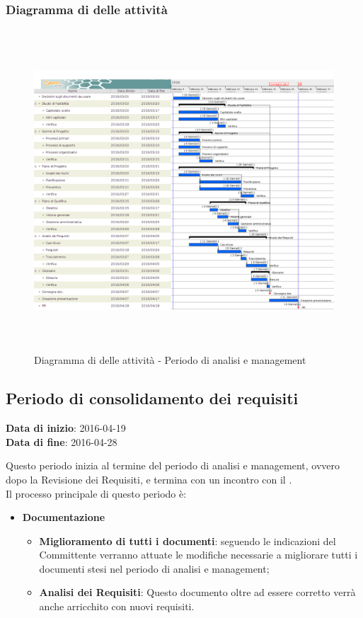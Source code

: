 		
		\subsubsection{Diagramma di  delle attività}
		
		\begin{figure}[!h]
			\centering
			\includegraphics[height=12cm, width=15cm]{img/gantt/A} 
			\caption{Diagramma di  delle attività - Periodo di analisi e management}
		\end{figure}
		
	\subsection{Periodo di consolidamento dei requisiti}
	\begin{center}
		\textbf{Data di inizio}: 2016-04-19 \\
		\textbf{Data di fine}: 2016-04-28 \\
	\end{center}
	Questo periodo inizia al termine del periodo di analisi e management, ovvero dopo la Revisione dei Requisiti, e termina con un incontro con il . \\ 
	Il processo principale di questo periodo è:
	\begin{itemize}
		\item \textbf{Documentazione}
		\att
		\begin{itemize}
			\item \textbf{Miglioramento di tutti i documenti}: seguendo le indicazioni del Committente verranno attuate le modifiche necessarie a migliorare tutti i documenti stesi nel periodo di analisi e management;
			\item \textbf{Analisi dei Requisiti}: Questo documento oltre ad essere corretto verrà anche arricchito con nuovi requisiti.
		\end{itemize}
	\end{itemize}
		
